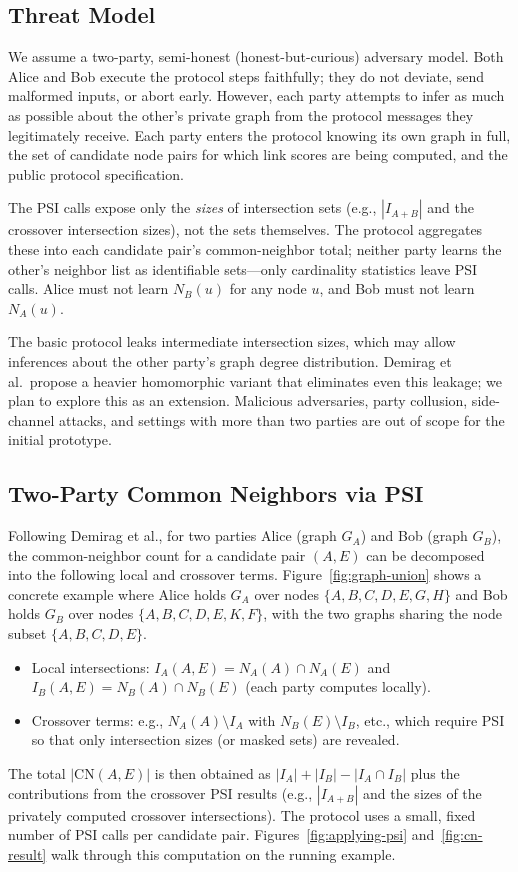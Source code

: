 \documentclass[sigconf]{acmart}
\begin{document}
\subsection{Threat Model}
\label{sec:midterm-threat-model}
We assume a two-party, semi-honest (honest-but-curious) adversary model. Both Alice and Bob execute the protocol steps faithfully; they do not deviate, send malformed inputs, or abort early. However, each party attempts to infer as much as possible about the other's private graph from the protocol messages they legitimately receive. Each party enters the protocol knowing its own graph in full, the set of candidate node pairs for which link scores are being computed, and the public protocol specification.

The PSI calls expose only the \emph{sizes} of intersection sets (e.g., $|I_{A+B}|$ and the crossover intersection sizes), not the sets themselves. The protocol aggregates these into each candidate pair's common-neighbor total; neither party learns the other's neighbor list as identifiable sets---only cardinality statistics leave PSI calls. Alice must not learn $N_B(u)$ for any node $u$, and Bob must not learn $N_A(u)$.

The basic protocol leaks intermediate intersection sizes, which may allow inferences about the other party's graph degree distribution. Demirag et al.\ propose a heavier homomorphic variant that eliminates even this leakage; we plan to explore this as an extension. Malicious adversaries, party collusion, side-channel attacks, and settings with more than two parties are out of scope for the initial prototype.

\subsection{Two-Party Common Neighbors via PSI}
Following Demirag et al., for two parties Alice (graph $G_A$) and Bob (graph $G_B$), the common-neighbor count for a candidate pair $(A,E)$ can be decomposed into the following local and crossover terms. Figure~\ref{fig:graph-union} shows a concrete example where Alice holds $G_A$ over nodes $\{A,B,C,D,E,G,H\}$ and Bob holds $G_B$ over nodes $\{A,B,C,D,E,K,F\}$, with the two graphs sharing the node subset $\{A,B,C,D,E\}$.
\begin{itemize}
  \item Local intersections: $I_A(A,E) = N_A(A) \cap N_A(E)$ and $I_B(A,E) = N_B(A) \cap N_B(E)$ (each party computes locally).
  \item Crossover terms: e.g., $N_A(A) \setminus I_A$ with $N_B(E) \setminus I_B$, etc., which require PSI so that only intersection sizes (or masked sets) are revealed.
\end{itemize}
The total $|\text{CN}(A,E)|$ is then obtained as $|I_A| + |I_B| - |I_A \cap I_B|$ plus the contributions from the crossover PSI results (e.g., $|I_{A+B}|$ and the sizes of the privately computed crossover intersections). The protocol uses a small, fixed number of PSI calls per candidate pair. Figures~\ref{fig:applying-psi} and~\ref{fig:cn-result} walk through this computation on the running example.
\end{document}
